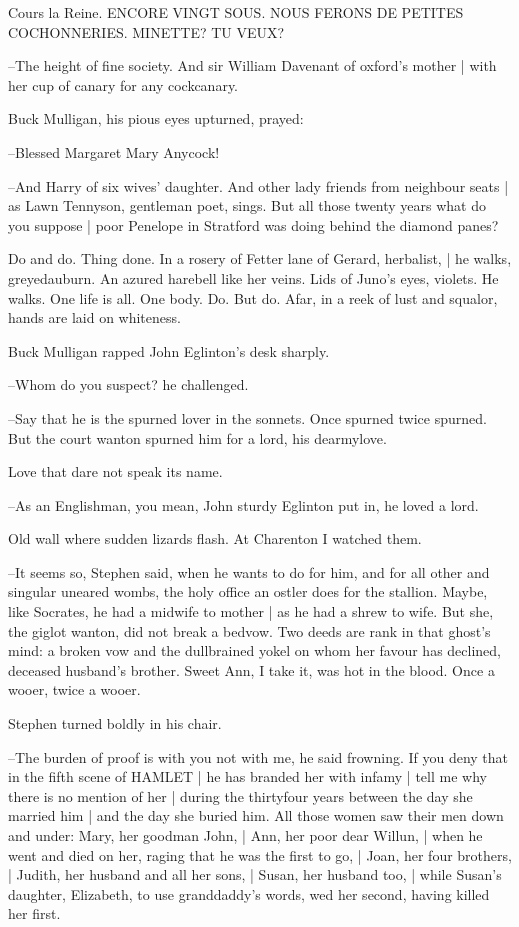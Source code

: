 Cours la Reine.
ENCORE VINGT SOUS.
NOUS FERONS DE PETITES COCHONNERIES.
MINETTE?
TU VEUX?

--The height of fine society.
And sir William Davenant of oxford's mother |
with her cup of canary for any cockcanary.

Buck Mulligan,
his pious eyes upturned,
prayed:

--Blessed Margaret Mary Anycock!

--And Harry of six wives' daughter.
And other lady friends from neighbour seats |
as Lawn Tennyson, gentleman poet,
sings.
But all those twenty years what do you suppose |
poor Penelope in Stratford was doing behind the diamond panes?

Do and do.
Thing done.
In a rosery of Fetter lane of Gerard, herbalist, |
he walks, greyedauburn.
An azured harebell like her veins.
Lids of Juno's eyes, violets.
He walks.
One life is all.
One body.
Do.
But do.
Afar,
in a reek of lust and squalor,
hands are laid on whiteness.

Buck Mulligan rapped John Eglinton's desk sharply.

--Whom do you suspect?
he challenged.

--Say that he is the spurned lover in the sonnets.
Once spurned twice spurned.
But the court wanton spurned him for a lord,
his dearmylove.

Love that dare not speak its name.

--As an Englishman,
you mean,
John sturdy Eglinton put in,
he loved a lord.

Old wall where sudden lizards flash.
At Charenton I watched them.

--It seems so,
Stephen said,
when he wants to do for him,
and for all other and singular uneared wombs,
the holy office an ostler does for the stallion.
Maybe,
like Socrates,
he had a midwife to mother |
as he had a shrew to wife.
But she,
the giglot wanton,
did not break a bedvow.
Two deeds are rank in that ghost's mind:
a broken vow and the dullbrained yokel on whom her favour has declined,
deceased husband's brother.
Sweet Ann,
I take it,
was hot in the blood.
Once a wooer,
twice a wooer.

Stephen turned boldly in his chair.

--The burden of proof is with you not with me,
he said frowning.
If you deny that in the fifth scene of HAMLET |
he has branded her with infamy |
tell me why there is no mention of her |
during the thirtyfour years between the day she married him |
and the day she buried him.
All those women saw their men down and under:
Mary, her goodman John, |
Ann, her poor dear Willun, |
when he went and died on her,
raging that he was the first to go, |
Joan, her four brothers, |
Judith, her husband and all her sons, |
Susan, her husband too, |
while Susan's daughter,
Elizabeth,
to use granddaddy's words,
wed her second,
having killed her first.

